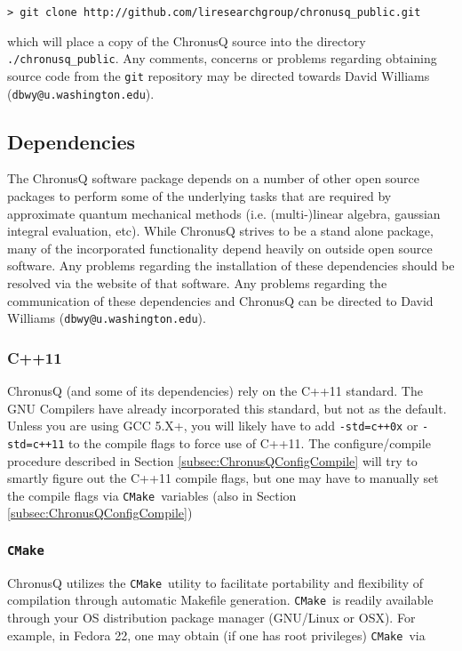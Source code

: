 \documentclass[12pt]{article}
\makeatletter
\newcommand{\DBWYContact}{David Williams (\texttt{dbwy@u.washington.edu})}
\newcommand{\CMake}{\texttt{CMake}}
\makeatother
\begin{document}
    \begin{lstlisting}
> git clone http://github.com/liresearchgroup/chronusq_public.git
    \end{lstlisting}
    
    \noindent which will place a copy of the ChronusQ source into the directory 
    \texttt{./chronusq\_public}. Any comments, concerns or problems regarding 
    obtaining source code from the \texttt{git} repository may be directed 
    towards \DBWYContact. 

    \subsection{Dependencies} \label{subsec:ChronusQDeps}

    The ChronusQ software package depends on a number of other open source packages
    to perform some of the underlying tasks that are required by approximate
    quantum mechanical methods (i.e. (multi-)linear algebra, gaussian integral 
    evaluation, etc). While ChronusQ strives to be a stand alone package, many
    of the incorporated functionality depend heavily on outside open source 
    software. Any problems regarding the installation of these dependencies should
    be resolved via the website of that software. Any problems regarding the
    communication of these dependencies and ChronusQ can be directed to
    \DBWYContact.
    
      \subsubsection{C++11} \label{subsubsec:C++11} 
        ChronusQ (and some of its dependencies) rely on the C++11 
        standard. The GNU Compilers have already incorporated this standard, but
	not as the default. Unless you are using GCC 5.X+, you will likely have
	to add \texttt{-std=c++0x} or \texttt{-std=c++11} to the compile flags
	to force use of C++11. The configure/compile procedure described in
	Section \ref{subsec:ChronusQConfigCompile} will try to smartly figure out
	the C++11 compile flags, but one may have to manually set the compile flags
	via \CMake~variables (also in Section \ref{subsec:ChronusQConfigCompile})

      \subsubsection{\CMake} \label{subsubsec:cmake} 
        ChronusQ utilizes the \CMake~utility to facilitate
        portability and flexibility of compilation through automatic Makefile 
	generation. \CMake~is readily available through your OS distribution
	package manager (GNU/Linux or OSX). For example, in Fedora 22, one may 
	obtain (if one has root privileges) \CMake~via
\end{document}
